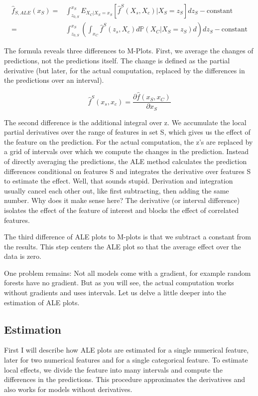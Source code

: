\documentclass[
  10pt,
]{scrbook}
\begin{document}
\begin{align*}
\hat{f}_{S,ALE}(x_S)=&\int_{z_{0,S}}^{x_S}E_{X_C|X_S = x_S}\left[\hat{f}^S(X_s,X_c)|X_S=z_S\right]dz_S-\text{constant}\\
 = & \int_{z_{0,S}}^{x_S}(\int_{x_C}\hat{f}^S(z_s,X_c)d\mathbb{P}(X_C|X_S = z_S)d{})dz_S-\text{constant}
\end{align*}

The formula reveals three differences to M-Plots.
First, we average the changes of predictions, not the predictions itself.
The change is defined as the partial derivative (but later, for the actual computation, replaced by the differences in the predictions over an interval).

\[\hat{f}^S(x_s,x_c)=\frac{\partial\hat{f}(x_S,x_C)}{\partial{}x_S}\]

The second difference is the additional integral over z.
We accumulate the local partial derivatives over the range of features in set S, which gives us the effect of the feature on the prediction.
For the actual computation, the z's are replaced by a grid of intervals over which we compute the changes in the prediction.
Instead of directly averaging the predictions, the ALE method calculates the prediction differences conditional on features S and integrates the derivative over features S to estimate the effect.
Well, that sounds stupid.
Derivation and integration usually cancel each other out, like first subtracting, then adding the same number.
Why does it make sense here?
The derivative (or interval difference) isolates the effect of the feature of interest and blocks the effect of correlated features.

The third difference of ALE plots to M-plots is that we subtract a constant from the results.
This step centers the ALE plot so that the average effect over the data is zero.

One problem remains:
Not all models come with a gradient, for example random forests have no gradient.
But as you will see, the actual computation works without gradients and uses intervals.
Let us delve a little deeper into the estimation of ALE plots.

\hypertarget{estimation}{%
\subsection{Estimation}\label{estimation}}

First I will describe how ALE plots are estimated for a single numerical feature, later for two numerical features and for a single categorical feature.
To estimate local effects, we divide the feature into many intervals and compute the differences in the predictions.
This procedure approximates the derivatives and also works for models without derivatives.
\end{document}
